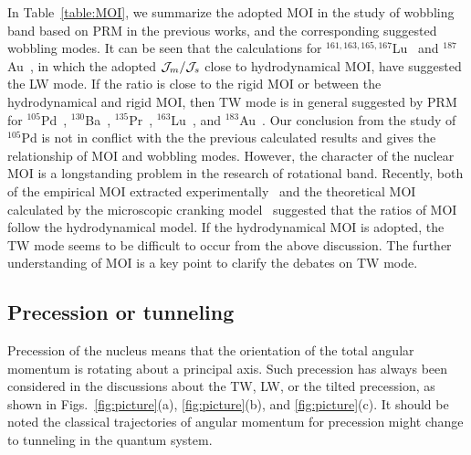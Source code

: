 \documentclass[aps,prc,preprint,showpacs,groupedaddress,floatfix,amsmath,amssymb]{revtex4-1}
\begin{document}
In Table~\ref{table:MOI}, we summarize the adopted MOI in the study of wobbling band based on PRM in the previous works, and the corresponding suggested wobbling modes. It can be seen that the calculations for $^{161,163,165,167}$Lu~\cite{Raduta2020PRC} and $^{187}$Au~\cite{Au187}, in which the adopted ${\cal J}_m/{\cal J}_s$ close to hydrodynamical MOI, have suggested the LW mode.
If the ratio is close to the rigid MOI or between the hydrodynamical and rigid MOI, then TW mode is in general suggested by PRM for $^{105}$Pd~\cite{Pd105}, $^{130}$Ba~\cite{Ba130}, $^{135}$Pr~\cite{Pr135,Frauendorf14,La133}, $^{163}$Lu~\cite{Frauendorf14}, and $^{183}$Au~\cite{Au183}.
Our conclusion from the study of $^{105}$Pd is not in conflict with the the previous calculated results and gives the relationship of  MOI and wobbling modes. However, the character of the nuclear MOI is a longstanding problem in the research of rotational band. Recently, both of the empirical MOI extracted experimentally~\cite{Allmond17} and the theoretical MOI calculated by the microscopic cranking model~\cite{Frauendorf182} suggested that the ratios of MOI follow the hydrodynamical model. If the hydrodynamical MOI is adopted, the TW mode seems to be difficult to occur from the above discussion.
The further understanding of MOI is a key point to clarify the debates on TW mode.



\subsection{Precession or tunneling}

Precession of the nucleus means that  the  orientation of the total angular momentum is rotating about a principal axis.
Such precession has always been considered in the discussions about the TW, LW, or the tilted precession, as shown in Figs.~\ref{fig:picture}(a), \ref{fig:picture}(b), and \ref{fig:picture}(c). It should be noted the classical trajectories of  angular momentum for precession might change to tunneling in the quantum system.
\end{document}
